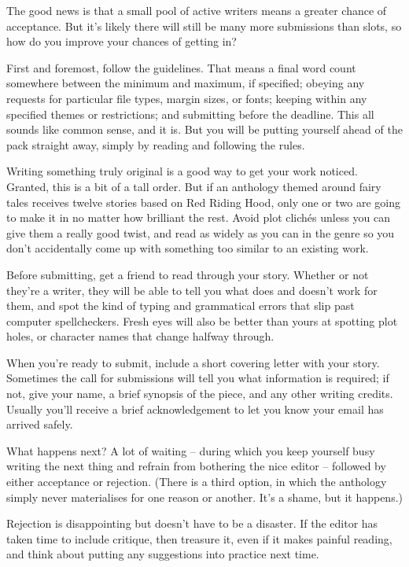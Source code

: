 The good news is that a small pool of active writers means a greater chance of acceptance. But it's likely there will still be many more submissions than slots, so how do you improve your chances of getting in?

First and foremost, follow the guidelines. That means a final word count somewhere between the minimum and maximum, if specified; obeying any requests for particular file types, margin sizes, or fonts; keeping within any specified themes or restrictions; and submitting before the deadline. This all sounds like common sense, and it is. But you will be putting yourself ahead of the pack straight away, simply by reading and following the rules.

Writing something truly original is a good way to get your work noticed. Granted, this is a bit of a tall order. But if an anthology themed around fairy tales receives twelve stories based on Red Riding Hood, only one or two are going to make it in no matter how brilliant the rest. Avoid plot clichés unless you can give them a really good twist, and read as widely as you can in the genre so you don't accidentally come up with something too similar to an existing work.

Before submitting, get a friend to read through your story. Whether or not they're a writer, they will be able to tell you what does and doesn't work for them, and spot the kind of typing and grammatical errors that slip past computer spellcheckers. Fresh eyes will also be better than yours at spotting plot holes, or character names that change halfway through.

When you're ready to submit, include a short covering letter with your story. Sometimes the call for submissions will tell you what information is required; if not, give your name, a brief synopsis of the piece, and any other writing credits. Usually you'll receive a brief acknowledgement to let you know your email has arrived safely.

What happens next? A lot of waiting -- during which you keep yourself busy writing the next thing and refrain from bothering the nice editor -- followed by either acceptance or rejection. (There is a third option, in which the anthology simply never materialises for one reason or another. It's a shame, but it happens.)

Rejection is disappointing but doesn't have to be a disaster. If the editor has taken time to include critique, then treasure it, even if it makes painful reading, and think about putting any suggestions into practice next time.

